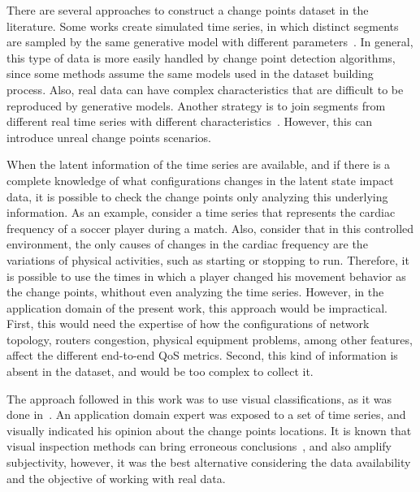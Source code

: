 There are several approaches to construct a
change points dataset in the literature.
Some works create simulated time series, in which distinct segments are sampled
by the same generative model with different
parameters~\cite{change_point_detection_in_time_series_data_by_relative_density_ratio_estimation}.
In general, this type of data is more easily handled by change point detection
algorithms, since some methods assume the same models used in the dataset
building process. Also, real data can have complex characteristics that are
difficult to be reproduced by generative models. Another strategy is to join
segments from different real time series with different
characteristics~\cite{inertial_hidden_markov_models_modeling_change_in_multivariate_time_series}.
However, this can introduce unreal change points scenarios.

When the latent information of the time series are available, and if there is a
complete knowledge of what configurations changes in the latent state impact
data, it is possible to check the change points only analyzing this underlying
information. As an example, consider a time series that represents the cardiac
frequency of a soccer player during a match. Also, consider that in this
controlled environment, the only causes of changes in the cardiac frequency are
the variations of physical activities, such as starting or stopping to run.
Therefore,
it is possible to use the times in which a player changed his movement behavior
as the change points, whithout even analyzing the time series. However, in the
application domain of the present work, this approach would be impractical.
First, this would need the expertise of how the configurations of network
topology, routers congestion, physical equipment problems, among other features,
affect the different end-to-end QoS metrics.
Second, this kind of information is absent in the dataset, and would be too
complex to collect it.

The approach followed in this work was to use visual classifications,
as it was done
in~\cite{learning_sparse_penalties_for_change_point_detection_using_max_margin_interval_regression}.
An application domain expert was exposed to a set of time series, and visually
indicated his opinion about the change points locations. It is known that visual
inspection methods can bring erroneous
conclusions~\cite{leveraging_cloud_data_to_mitigate_user_experience_from_breaking_bad},
and also amplify subjectivity, however, it was the best alternative considering
the data availability and the objective of working with real data.

